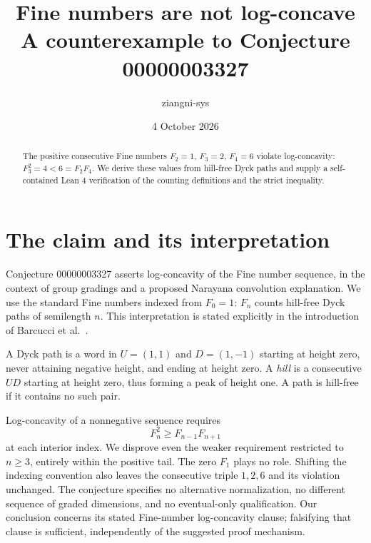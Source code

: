 \documentclass[11pt,a4paper]{article}
\title{Fine numbers are not log-concave\\\large A counterexample to Conjecture 00000003327}
\author{ziangni-sys}
\date{4 October 2026}
\begin{document}
\maketitle
\begin{abstract}
The positive consecutive Fine numbers $F_2=1$, $F_3=2$, $F_4=6$
violate log-concavity: $F_3^2=4<6=F_2F_4$.
We derive these values from hill-free Dyck paths and supply a
self-contained Lean 4 verification of the counting definitions and
the strict inequality.
\end{abstract}

\section{The claim and its interpretation}
Conjecture 00000003327 asserts log-concavity of the Fine number
sequence, in the context of group gradings and a proposed Narayana
convolution explanation. We use the standard Fine numbers indexed
from $F_0=1$: $F_n$ counts hill-free Dyck paths of semilength $n$.
This interpretation is stated explicitly in the introduction of
Barcucci et al.~\cite{hillfree}.

A Dyck path is a word in $U=(1,1)$ and $D=(1,-1)$ starting at height
zero, never attaining negative height, and ending at height zero.
A \emph{hill} is a consecutive $UD$ starting at height zero, thus
forming a peak of height one. A path is hill-free if it contains
no such pair.

Log-concavity of a nonnegative sequence requires
\[
  F_n^2\geq F_{n-1}F_{n+1}
\]
at each interior index. We disprove even the weaker requirement
restricted to $n\geq3$, entirely within the positive tail. The zero
$F_1$ plays no role. Shifting the indexing convention also leaves
the consecutive triple $1,2,6$ and its violation unchanged.
The conjecture specifies no alternative normalization, no different
sequence of graded dimensions, and no eventual-only qualification.
Our conclusion concerns its stated Fine-number log-concavity clause;
falsifying that clause is sufficient, independently of the suggested
proof mechanism.
\end{document}
